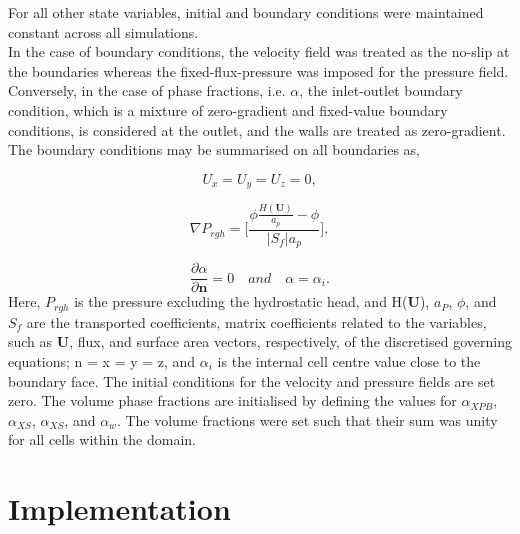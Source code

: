 For all other state variables, initial and boundary conditions were maintained constant across all simulations.\\

In the case of boundary conditions, the velocity field was treated as the no-slip at the boundaries whereas the fixed-flux-pressure was imposed for the pressure field. Conversely, in the case of phase fractions, i.e. ${\alpha}$, the inlet-outlet boundary condition, which is a mixture of zero-gradient and fixed-value boundary conditions, is considered at the outlet, and the walls are treated as zero-gradient. The boundary conditions may be summarised on all boundaries as,  

\begin{equation}
    \label{eq:boundaryU}
    U_x = U_y = U_z = 0,
\end{equation}

\begin{equation}
    \label{eq:boundaryPrgh}
    \nabla P_{rgh} = \bigg[\frac{\phi \frac{H(\mathbf{U})}{a_p} - \phi}{|S_f|a_p} \bigg],
\end{equation}

\begin{equation}
    \label{eq:boundaryAlpha}
    \frac{\partial \alpha}{\partial \mathbf{n}} = 0 \quad {and} \quad \alpha = \alpha_i.
\end{equation}
Here, ${P_{rgh}}$ is the pressure excluding the hydrostatic head, and H(\textbf{U}), ${a_P}$, ${\phi}$, and ${S_f}$ are the transported coefficients, matrix coefficients related to the variables, such as \textbf{U}, flux, and surface area vectors, respectively, of the discretised governing equations; n = x = y = z, and ${\alpha_i}$ is the internal cell centre value close to the boundary face. The initial conditions for the velocity and pressure fields are set zero. The volume phase fractions are initialised by defining the values for $\alpha_{{XPB}}$, $\alpha_{{XS}}$, $\alpha_{{XS}}$, and $\alpha_{{w}}$. The volume fractions were set such that their sum was unity for all cells within the domain. 


\section{Implementation}

